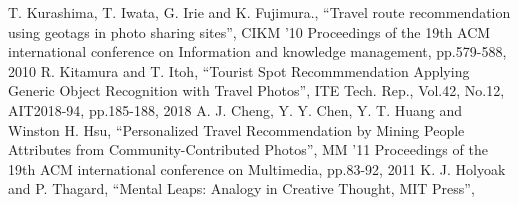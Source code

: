 \documentclass{deimj}
\begin{document}
\vspace{2em}
\begin{thebibliography}{99}
    T. Kurashima, T. Iwata, G. Irie and K. Fujimura.,
      ``Travel route recommendation using geotags in photo sharing sites'',
      CIKM '10 Proceedings of the 19th ACM international conference on Information and knowledge management, pp.579-588, 2010
    R. Kitamura and T. Itoh,
      ``Tourist Spot Recommmendation Applying Generic Object Recognition with Travel Photos'',
      ITE Tech. Rep., Vol.42, No.12, AIT2018-94, pp.185-188, 2018
    A. J. Cheng, Y. Y. Chen, Y. T. Huang and Winston H. Hsu,
      ``Personalized Travel Recommendation by Mining People Attributes from Community-Contributed Photos'',
      MM '11 Proceedings of the 19th ACM international conference on Multimedia, pp.83-92, 2011
    K. J. Holyoak and P. Thagard,
      ``Mental Leaps: Analogy in Creative Thought, MIT Press'',

\end{thebibliography}
\end{document}
